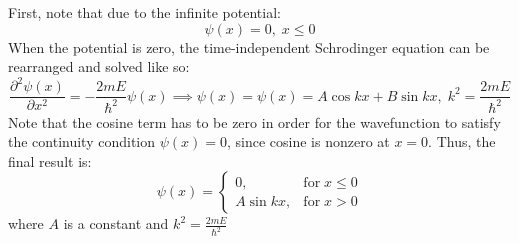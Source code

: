 \begin{sol}
First, note that due to the infinite potential: $$\psi(x) = 0, \;x \leq 0$$When the potential is zero, the time-independent Schrodinger equation can be rearranged and solved like so: $$\frac{\partial^2\psi(x)}{\partial x^2} = -\frac{2mE}{\hbar^2}\psi(x)\implies \psi(x) = \psi(x) = A\cos{kx} + B\sin{kx},\;k^2 = \frac{2mE}{\hbar^2}$$Note that the cosine term has to be zero in order for the wavefunction to satisfy the continuity condition $\psi(x) = 0$, since cosine is nonzero at $x = 0$. Thus, the final result is: \[ \psi(x) = \begin{cases} 
      0, & \mathrm{for}\;x\leq 0 \\
      A\sin{kx}, & \mathrm{for}\;x> 0
   \end{cases}
\] where $A$ is a constant and $k^2 = \frac{2mE}{\hbar^2}$

\end{sol}